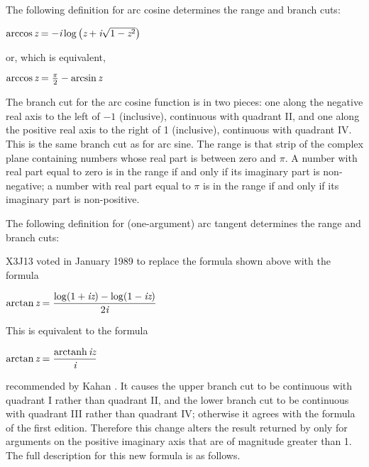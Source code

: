 \begin{flushdesc}
\item[\cdf{acos}]
The following definition for arc cosine determines the range and
branch cuts:
\begin{tabbing}
$ \arccos \emph{z}=-\emph{i} \log \left(\emph{z}+\emph{i} \sqrt{1-\emph{z}^2}\right) $
\end{tabbing}
or, which is equivalent,
\begin{tabbing}
$ \arccos \emph{z}={\pi \over 2}-\arcsin \emph{z} $
\end{tabbing}
The branch cut for the arc cosine function is in two pieces:
one along the negative real axis to the left of $-1$
(inclusive), continuous with quadrant II, and one along the positive real
axis to the right of 1 (inclusive), continuous with quadrant IV.  
This is the same branch cut as for arc sine.
The range is that strip of the complex plane containing numbers whose real
part is between zero and $\pi$.  A number with real
part equal to zero is in the range if and only if its imaginary
part is non-negative; a number with real part equal to $\pi$ is in
the range if and only if its imaginary part is non-positive.

\item[\cdf{atan}]
The following definition for (one-argument) arc tangent determines the
range and branch cuts:

\begin{new}
X3J13 voted in January 1989
to replace the formula shown above with the formula
\begin{tabbing}
$ \displaystyle \arctan \emph{z} = { \log (1+\emph{i}\emph{z}) - \log (1-\emph{i}\emph{z}) \over 2\emph{i} }$
\end{tabbing}
This is equivalent to the formula
\begin{tabbing}
$ \displaystyle \arctan \emph{z} = { \mathop\textrm{arctanh}\nolimits \emph{i}\emph{z} \over \emph{i} }$
\end{tabbing}
recommended by Kahan \cite{KAHAN-COMPLEX-FNS}.
It causes the upper branch cut to be continuous with
quadrant I rather than quadrant II, and the lower branch cut to
be continuous with quadrant III rather than quadrant IV; otherwise it agrees with the
formula of the first edition.  Therefore this change alters the result returned by 
only for arguments on the positive imaginary axis that
are of magnitude greater than 1.  The full description for this new formula is as follows.


\end{new}
\end{flushdesc}
